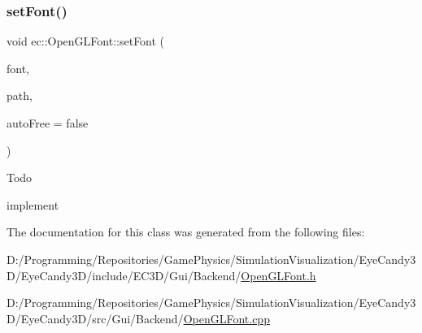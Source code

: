 \subsubsection{\texorpdfstring{set\+Font()}{setFont()}}
{\footnotesize\ttfamily void ec\+::\+Open\+G\+L\+Font\+::set\+Font (\begin{DoxyParamCaption}\item[{\mbox{\hyperlink{classec_1_1_font_texture_atlas}{ec\+::\+Font\+Texture\+Atlas}} $\ast$}]{font,  }\item[{const std\+::string \&}]{path,  }\item[{bool}]{auto\+Free = {\ttfamily false} }\end{DoxyParamCaption})\hspace{0.3cm}{\ttfamily [virtual]}}

\begin{DoxyRefDesc}{Todo}
\item[\mbox{\hyperlink{todo__todo000014}{Todo}}]implement \end{DoxyRefDesc}


The documentation for this class was generated from the following files\+:\begin{DoxyCompactItemize}
\item 
D\+:/\+Programming/\+Repositories/\+Game\+Physics/\+Simulation\+Visualization/\+Eye\+Candy3\+D/\+Eye\+Candy3\+D/include/\+E\+C3\+D/\+Gui/\+Backend/\mbox{\hyperlink{_open_g_l_font_8h}{Open\+G\+L\+Font.\+h}}\item 
D\+:/\+Programming/\+Repositories/\+Game\+Physics/\+Simulation\+Visualization/\+Eye\+Candy3\+D/\+Eye\+Candy3\+D/src/\+Gui/\+Backend/\mbox{\hyperlink{_open_g_l_font_8cpp}{Open\+G\+L\+Font.\+cpp}}\end{DoxyCompactItemize}
